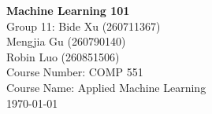 \begin{titlepage}
\begin{center}

\HRule

\textbf{\Huge Machine Learning 101} \\
\bigskip\bigskip\bigskip\bigskip\bigskip\bigskip\bigskip\bigskip\bigskip\bigskip\bigskip
{Group 11: Bide Xu (260711367)}\\
{Mengjia Gu (260790140)}\\
{Robin Luo (260851506)}\\
\bigskip\bigskip\bigskip\bigskip\bigskip\bigskip\bigskip\bigskip\bigskip\bigskip\bigskip
{Course Number: COMP 551}\\
{Course Name: Applied Machine Learning}\\
{\today}

\end{center}
\end{titlepage} 
